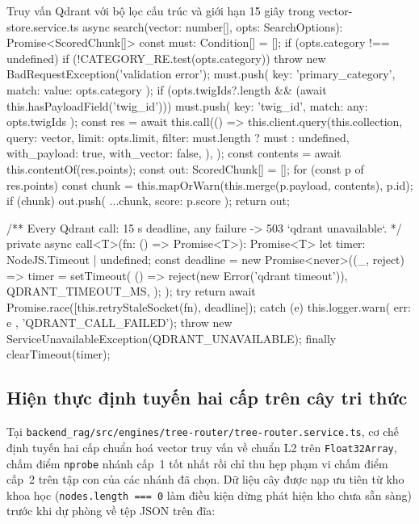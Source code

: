 \begin{tsbox}{Truy vấn Qdrant với bộ lọc cấu trúc và giới hạn 15 giây trong vector-store.service.ts}
async search(vector: number[], opts: SearchOptions): Promise<ScoredChunk[]> {
  const must: Condition[] = [];
  if (opts.category !== undefined) {
    if (!CATEGORY_RE.test(opts.category))
      throw new BadRequestException('validation error');
    must.push({ key: 'primary_category', match: { value: opts.category } });
  }
  if (opts.twigIds?.length && (await this.hasPayloadField('twig_id'))) {
    must.push({ key: 'twig_id', match: { any: opts.twigIds } });
  }
  const res = await this.call(() =>
    this.client.query(this.collection, {
      query: vector,
      limit: opts.limit,
      filter: must.length ? { must } : undefined,
      with_payload: true,
      with_vector: false,
    }),
  );
  const contents = await this.contentOf(res.points);
  const out: ScoredChunk[] = [];
  for (const p of res.points) {
    const chunk = this.mapOrWarn(this.merge(p.payload, contents), p.id);
    if (chunk) out.push({ ...chunk, score: p.score });
  }
  return out;
}

/** Every Qdrant call: 15 s deadline, any failure -> 503 `qdrant unavailable`. */
private async call<T>(fn: () => Promise<T>): Promise<T> {
  let timer: NodeJS.Timeout | undefined;
  const deadline = new Promise<never>((_, reject) => {
    timer = setTimeout(
      () => reject(new Error('qdrant timeout')),
      QDRANT_TIMEOUT_MS,
    );
  });
  try {
    return await Promise.race([this.retryStaleSocket(fn), deadline]);
  } catch (e) {
    this.logger.warn({ err: e }, 'QDRANT_CALL_FAILED');
    throw new ServiceUnavailableException(QDRANT_UNAVAILABLE);
  } finally {
    clearTimeout(timer);
  }
}
\end{tsbox}

\subsection{Hiện thực định tuyến hai cấp trên cây tri thức}
\label{subsec:dinh-tuyen-cay}

Tại \texttt{backend\_\allowbreak{}rag/\allowbreak{}src/\allowbreak{}engines/\allowbreak{}tree-\allowbreak{}router/\allowbreak{}tree-\allowbreak{}router.\allowbreak{}service.\allowbreak{}ts}, cơ chế định tuyến hai cấp chuẩn hoá vector truy vấn về chuẩn L2 trên \texttt{Float32Array}, chấm điểm \texttt{nprobe} nhánh cấp~1 tốt nhất rồi chỉ thu hẹp phạm vi chấm điểm cấp~2 trên tập con của các nhánh đã chọn. Dữ liệu cây được nạp ưu tiên từ kho khoa học (\texttt{nodes.length === 0} làm điều kiện dừng phát hiện kho chưa sẵn sàng) trước khi dự phòng về tệp JSON trên đĩa:


